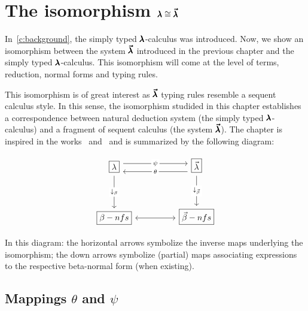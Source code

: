 \chapter{The isomorphism $\pmb{\lambda} \cong \pmb{\vec \lambda}$}
\label{c:isomorphism}

In~\cref{c:background}, the simply typed $\pmb{\lambda}$-calculus was introduced.
Now, we show an isomorphism between the system $\pmb{\vec \lambda}$ introduced in the previous chapter and the simply typed $\pmb{\lambda}$-calculus.
This isomorphism will come at the level of terms, reduction, normal forms and typing rules.

This isomorphism is of great interest as $\pmb{\vec \lambda}$ typing rules resemble a sequent calculus style.
In this sense, the isomorphism studided in this chapter establishes a correspondence between natural deduction system (the simply typed $\pmb{\lambda}$-calculus) and a fragment of sequent calculus (the system $\pmb{\vec \lambda}$).
The chapter is inspired in the works~\cite{LuisDychkoff} and~\cite[Chapter~4]{JCES2002} and is summarized by the following diagram:

\[\begin{tikzcd}
    {\boxed\lambda} && {\boxed{\vec \lambda}} \\
    \\
    {\boxed{\beta-nfs}} && {\boxed{\vec \beta-nfs}}
    \arrow["\psi"{description}, shift left=2, from=1-1, to=1-3]
    \arrow["{\downarrow_\beta}"{description}, from=1-1, to=3-1]
    \arrow["\theta"{description}, shift left=2, from=1-3, to=1-1]
    \arrow["{\downarrow_{\vec \beta}}"{description}, from=1-3, to=3-3]
    \arrow[<->, from=3-1, to=3-3]
  \end{tikzcd}\]

In this diagram: the horizontal arrows symbolize the inverse maps underlying the isomorphism; the down arrows symbolize (partial) maps associating expressions to the respective beta-normal form (when existing).

\section{Mappings $\theta$ and $\psi$}


